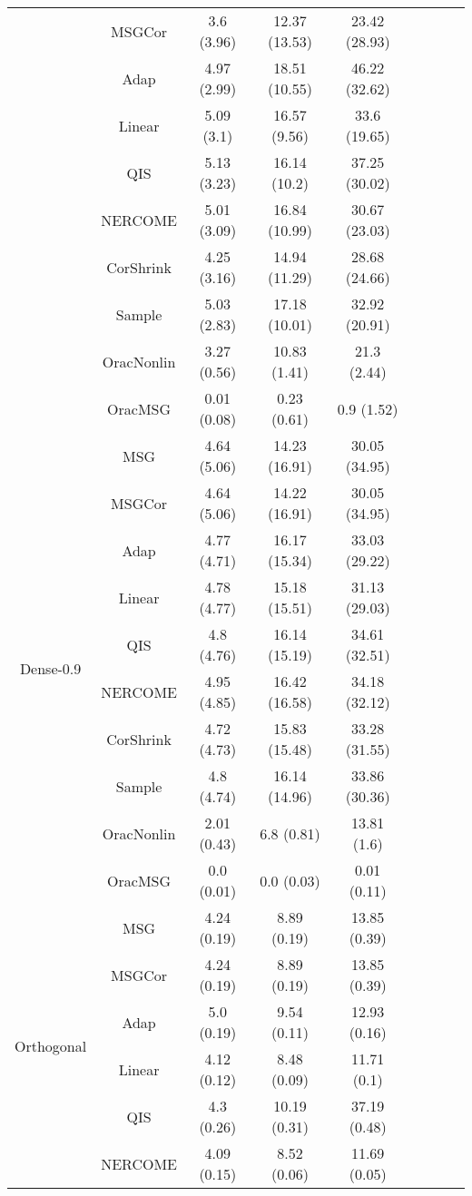 \documentclass[useAMS,referee,usenatbib]{biom}
\begin{document}
\begin{table}[H]
{\begin{tabular}{ccccccccc}
 & MSGCor   & 3.6 (3.96)  & 12.37 (13.53) & 23.42 (28.93) \\
 & Adap     & 4.97 (2.99) & 18.51 (10.55) & 46.22 (32.62) \\
 & Linear         & 5.09 (3.1)  & 16.57 (9.56)  & 33.6 (19.65)  \\
 & QIS            & 5.13 (3.23) & 16.14 (10.2)  & 37.25 (30.02) \\
 & NERCOME        & 5.01 (3.09) & 16.84 (10.99) & 30.67 (23.03) \\
 & CorShrink      & 4.25 (3.16) & 14.94 (11.29) & 28.68 (24.66) \\
 & Sample            & 5.03 (2.83) & 17.18 (10.01) & 32.92 (20.91) \\
 & OracNonlin & 3.27 (0.56) & 10.83 (1.41)  & 21.3 (2.44)   \\
 & OracMSG  & 0.01 (0.08) & 0.23 (0.61)   & 0.9 (1.52)  \\  \midrule
\multirow{10}{*}{Dense-0.9}    
 & MSG & 4.64 (5.06) & 14.23 (16.91) & 30.05 (34.95) \\
 & MSGCor   & 4.64 (5.06) & 14.22 (16.91) & 30.05 (34.95) \\
 & Adap     & 4.77 (4.71) & 16.17 (15.34) & 33.03 (29.22) \\
 & Linear         & 4.78 (4.77) & 15.18 (15.51) & 31.13 (29.03) \\
 & QIS            & 4.8 (4.76)  & 16.14 (15.19) & 34.61 (32.51) \\
 & NERCOME        & 4.95 (4.85) & 16.42 (16.58) & 34.18 (32.12) \\
 & CorShrink      & 4.72 (4.73) & 15.83 (15.48) & 33.28 (31.55) \\
 & Sample            & 4.8 (4.74)  & 16.14 (14.96) & 33.86 (30.36) \\
 & OracNonlin & 2.01 (0.43) & 6.8 (0.81)    & 13.81 (1.6)   \\
 & OracMSG  & 0.0 (0.01)  & 0.0 (0.03)    & 0.01 (0.11) \\ \midrule
\multirow{10}{*}{Orthogonal}  
 & MSG & 4.24 (0.19) & 8.89 (0.19)  & 13.85 (0.39) \\
 & MSGCor   & 4.24 (0.19) & 8.89 (0.19)  & 13.85 (0.39) \\
 & Adap     & 5.0 (0.19)  & 9.54 (0.11)  & 12.93 (0.16) \\
 & Linear         & 4.12 (0.12) & 8.48 (0.09)  & 11.71 (0.1)  \\
 & QIS            & 4.3 (0.26)  & 10.19 (0.31) & 37.19 (0.48) \\
 & NERCOME        & 4.09 (0.15) & 8.52 (0.06)  & 11.69 (0.05) \\

\end{tabular}}
\end{table}
\end{document}
